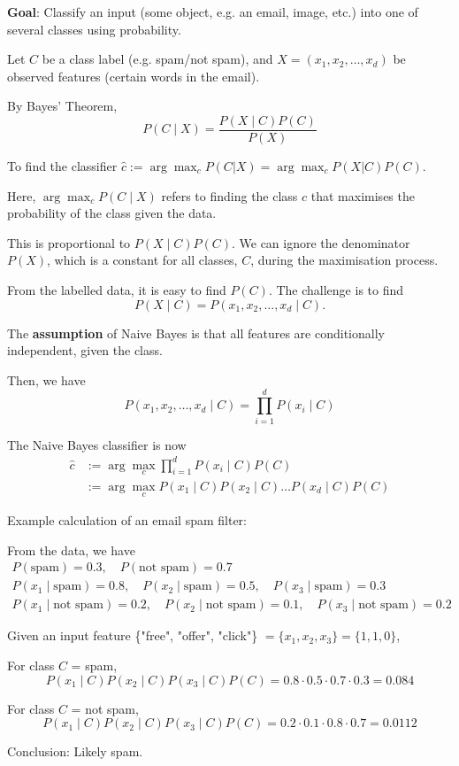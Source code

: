 \documentclass[../Probability.tex]{subfiles}
\begin{document}
\medskip

\noindent \textbf{Goal}: Classify an input (some object, e.g. an email, image, etc.)
into one of several classes using probability.

\medskip

\noindent Let $C$ be a class label (e.g. spam/not spam), and $X = (x_1, x_2, \ldots, x_d)$
be observed features (certain words in the email).

\medskip

\noindent By Bayes' Theorem,
\[P(C \mid X) = \frac{P(X \mid C)P(C)}{P(X)}\]

\noindent To find the classifier $ \hat{c} := \arg\max_c P(C|X) = \arg\max_c P(X|C)P(C).$

\medskip

\noindent Here, $\arg\max_c P(C \mid X)$ refers to finding the class $c$ that maximises the probability
of the class given the data.

\noindent This is proportional to $P(X \mid C)P(C)$. We can ignore the denominator $P(X)$,
which is a constant for all classes, $C$, during the maximisation process.

\medskip

\noindent From the labelled data, it is easy to find $P(C)$. The challenge
is to find
\[P(X \mid C) = P(x_1, x_2, \ldots, x_d \mid C).\]

\medskip

\noindent The \textbf{assumption} of Naive Bayes is that all features are conditionally independent, given the class.

\noindent Then, we have
\[P(x_1, x_2, \ldots, x_d \mid C) = \prod_{i=1}^{d}P(x_i \mid C)\]

\noindent The Naive Bayes classifier is now
\begin{align*}
    \hat{c} &:= \arg\max_c \prod_{i=1}^{d}P(x_i \mid C)P(C) \\
            &:= \arg\max_c P(x_1 \mid C)P(x_2 \mid C)\ldots P(x_d \mid C)P(C)
\end{align*}

\noindent Example calculation of an email spam filter:

\noindent From the data, we have
\begin{gather*}
    P(\text{spam}) = 0.3, \quad P(\text{not spam}) = 0.7 \\
    P(x_1 \mid \text{spam}) = 0.8, \quad P(x_2 \mid \text{spam}) = 0.5, \quad P(x_3 \mid \text{spam}) = 0.3 \\
    P(x_1 \mid \text{not spam}) = 0.2, \quad P(x_2 \mid \text{not spam}) = 0.1, \quad P(x_3 \mid \text{not spam}) = 0.2
\end{gather*}

\noindent Given an input feature \{"free", "offer", "click"\} $= \{x_1, x_2, x_3\} = \{1, 1, 0\}$,

\noindent For class $C$ = spam,
\[P(x_1\mid C)P(x_2\mid C)P(x_3\mid C)P(C) = 0.8\cdot0.5\cdot0.7\cdot0.3 = 0.084\]

\noindent For class $C$ = not spam,
\[P(x_1\mid C)P(x_2\mid C)P(x_3\mid C)P(C) = 0.2\cdot0.1\cdot0.8\cdot0.7 = 0.0112\]

\noindent Conclusion: Likely spam.
\end{document}
